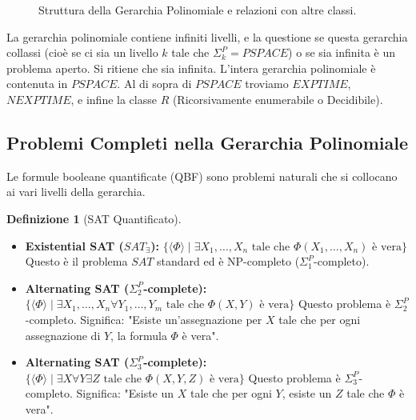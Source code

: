 \documentclass[a4paper]{article}
\theoremstyle{definition} %
\newtheorem{definition}{Definizione}
\begin{document}
\begin{figure}[h]
    \caption{Struttura della Gerarchia Polinomiale e relazioni con altre classi.}
    \label{fig:polynomial_hierarchy}
\end{figure}

La gerarchia polinomiale contiene infiniti livelli, e la questione se questa gerarchia collassi (cioè se ci sia un livello $k$ tale che $\Sigma_k^P = PSPACE$) o se sia infinita è un problema aperto. Si ritiene che sia infinita. L'intera gerarchia polinomiale è contenuta in $PSPACE$. Al di sopra di $PSPACE$ troviamo $EXPTIME$, $NEXPTIME$, e infine la classe $R$ (Ricorsivamente enumerabile o Decidibile).

\subsection{Problemi Completi nella Gerarchia Polinomiale}
Le formule booleane quantificate (QBF) sono problemi naturali che si collocano ai vari livelli della gerarchia.

\begin{definition}[SAT Quantificato]
\begin{itemize}
    \item \textbf{Existential SAT ($SAT_{\exists}$):}
    $\{ \langle \Phi \rangle \mid \exists X_1, \dots, X_n \text{ tale che } \Phi(X_1, \dots, X_n) \text{ è vera} \}$
    Questo è il problema $SAT$ standard ed è NP-completo ($\Sigma_1^P$-completo).
    \item \textbf{Alternating SAT ($\Sigma_2^P$-complete):}
    $\{ \langle \Phi \rangle \mid \exists X_1, \dots, X_n \forall Y_1, \dots, Y_m \text{ tale che } \Phi(X, Y) \text{ è vera} \}$
    Questo problema è $\Sigma_2^P$-completo. Significa: "Esiste un'assegnazione per $X$ tale che per ogni assegnazione di $Y$, la formula $\Phi$ è vera".
    \item \textbf{Alternating SAT ($\Sigma_3^P$-complete):}
    $\{ \langle \Phi \rangle \mid \exists X \forall Y \exists Z \text{ tale che } \Phi(X, Y, Z) \text{ è vera} \}$
    Questo problema è $\Sigma_3^P$-completo. Significa: "Esiste un $X$ tale che per ogni $Y$, esiste un $Z$ tale che $\Phi$ è vera".
\end{itemize}
\end{definition}
\end{document}
